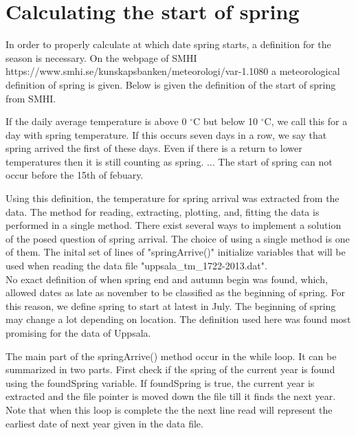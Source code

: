 \documentclass[a4paper,12pt]{article}
\begin{document}
\section{Calculating the start of spring}
In order to properly calculate at which date spring starts, a 
definition for the season is necessary. On the webpage of SMHI 
https://www.smhi.se/kunskapsbanken/meteorologi/var-1.1080
a meteorological definition of spring is given. Below is given the 
definition of the start of spring from SMHI.

\hfill\begin{minipage}[c]{\textwidth-2cm}
	If the daily average temperature is above 0 $^\circ$C but below 10 
	$^\circ$C, we call this for a day with spring temperature. If this 
	occurs seven days in a row,	we say that spring arrived the first of 
	these days. Even if there is a return to lower temperatures then it is
	still counting as spring.
	\newline
	$\ldots$
	\newline
	The start of spring can not occur before the 15th of febuary.
\end{minipage}

\noindent Using this definition, the temperature for spring arrival was 
extracted from the data. The method for reading, extracting, plotting, 
and, fitting the data is performed in a single method. There exist 
several ways to implement a solution of the posed question of spring 
arrival. The choice of using a single method is one of them. The inital 
set of lines of "springArrive()" initialize variables that will be used 
when reading the data file "uppsala\_tm\_1722-2013.dat".
\\\indent
No exact definition of when spring end and autumn begin was found, 
which, allowed dates as late as november to be classified as the 
beginning of spring. For this reason, we define spring to start at 
latest in July. The beginning of spring may change a lot depending on 
location. The definition used here was found most promising for the 
data of Uppsala. 

The main part of the springArrive() method occur in the while loop. It 
can be summarized in two parts. First check if the spring of the 
current year is found using the foundSpring variable. If foundSpring is 
true, the current year is extracted and the file pointer is moved down 
the file till it finds the next year. Note that when this loop is 
complete the the next line read will represent the earliest date
of next year given in the data file.
\end{document}
